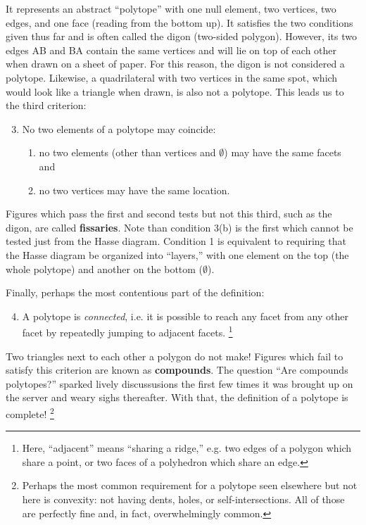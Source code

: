 \documentclass{article}
\begin{document}
It represents an abstract ``polytope'' with
one null element, two vertices, two edges, and one face (reading from the bottom up).
It satisfies the two conditions given thus far and is often called the digon (two-sided polygon).
However, its two edges AB and BA contain the same vertices
and will lie on top of each other when drawn on a sheet of paper.
For this reason, the digon is not considered a polytope.
Likewise, a quadrilateral with two vertices in the same spot,
which would look like a triangle when drawn, is also not a polytope.
This leads us to the third criterion:

\begin{enumerate}
  \setcounter{enumi}{2}
  \item No two elements of a polytope may coincide:
  \begin{enumerate}
    \item no two elements (other than vertices and $\emptyset$) may have the same facets and
    \item no two vertices may have the same location.
  \end{enumerate}
\end{enumerate}

Figures which pass the first and second tests but not this third,
such as the digon, are called \textbf{fissaries}.
Note than condition 3(b) is the first which cannot be tested just from the Hasse diagram.
Condition 1 is equivalent to requiring that the Hasse diagram be organized into ``layers,''
with one element on the top (the whole polytope) and another on the bottom ($\emptyset$).

Finally, perhaps the most contentious part of the definition: 

\begin{enumerate}
  \setcounter{enumi}{3}
\item
  A polytope is \textit{connected}, i.e.
  it is possible to reach any facet from any other facet
  by repeatedly jumping to adjacent facets.
  \footnote{
    Here, ``adjacent'' means ``sharing a ridge,''
    e.g. two edges of a polygon which share a point,
    or two faces of a polyhedron which share an edge.
  }
\end{enumerate}

Two triangles next to each other a polygon do not make!
Figures which fail to satisfy this criterion are known as \textbf{compounds}.
The question ``Are compounds polytopes?'' sparked lively discussusions
the first few times it was brought up on the server
and weary sighs thereafter.
With that, the definition of a polytope is complete!
\footnote{
  Perhaps the most common requirement for a polytope seen elsewhere but not here
  is convexity: not having dents, holes, or self-intersections.
  All of those are perfectly fine and, in fact, overwhelmingly common.
}
\end{document}
